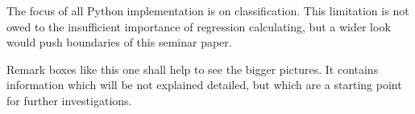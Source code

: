 The focus of all Python implementation is on classification. This limitation is not owed to the insufficient importance of regression calculating, but a wider look would push boundaries of this seminar paper.   

\begin{remark}
    Remark boxes like this one shall help to see the bigger pictures. It contains information which will be not explained detailed, but which are a starting point for further investigations.
\end{remark}




\newpage

